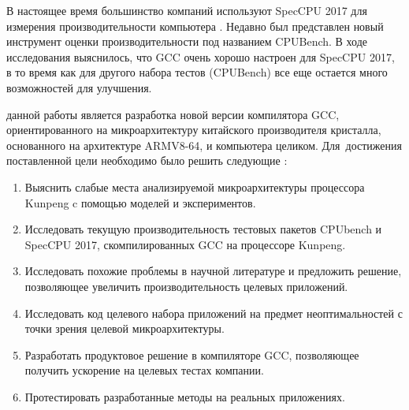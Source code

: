В настоящее время большинство компаний используют SpecCPU 2017 для измерения производительности компьютера \ifsynopsis\else \cite{panda2018wait,bucek2018spec}\fi. Недавно был представлен новый инструмент оценки производительности под названием CPUBench\ifsynopsis\else\phantom{ }\cite {lu2023cpubench}\fi. В ходе исследования выяснилось, что GCC очень хорошо настроен для SpecCPU 2017, в то время как для другого набора тестов (CPUBench) все еще остается много возможностей для улучшения.



{\aim} данной работы является 
разработка новой версии компилятора GCC, ориентированного на микроархитектуру китайского производителя кристалла, основанного на архитектуре ARMV8-64, 
и компьютера целиком.
Для~достижения поставленной цели необходимо было решить следующие {\tasks}:
\begin{enumerate}[beginpenalty=10000] %
  \item Выяснить слабые места анализируемой микроархитектуры процессора Kunpeng c помощью моделей и экспериментов.
  \item Исследовать текущую производительность тестовых пакетов CPUbench и SpecCPU 2017, скомпилированных GCC на процессоре Kunpeng.
  \item Исследовать похожие проблемы в научной литературе и предложить решение, позволяющее увеличить производительность целевых приложений.
  \item Исследовать код целевого набора приложений на предмет неоптимальностей с точки зрения целевой микроархитектуры.
  \item Разработать продуктовое решение в компиляторе GCC, позволяющее получить ускорение на целевых тестах компании.
  \item Протестировать разработанные методы на реальных приложениях. 
\end{enumerate}

